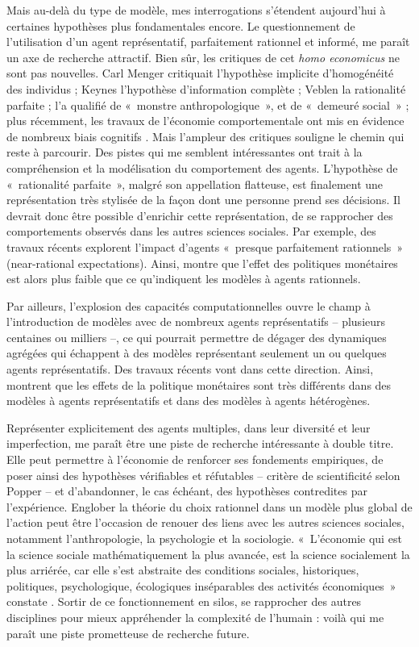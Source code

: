 Mais au-delà du type de modèle, mes interrogations s'étendent aujourd'hui à certaines hypothèses plus fondamentales encore. 
Le questionnement de l’utilisation d’un agent représentatif, parfaitement rationnel et informé, me paraît un axe de recherche attractif. Bien sûr, les critiques de cet \textit{homo economicus} ne sont pas nouvelles. Carl Menger critiquait l’hypothèse implicite d’homogénéité des individus ; Keynes l’hypothèse d’information complète ; Veblen la rationalité parfaite ; \citet{Bourdieu1977} l’a qualifié de «~monstre anthropologique~», et \citet{Sen2012} de «~demeuré social~» ; plus récemment, les travaux de l’économie comportementale ont mis en évidence de nombreux biais cognitifs \citep{Thaler2009,Kahneman2011}.
Mais l’ampleur des critiques souligne le chemin qui reste à parcourir. Des pistes qui me semblent intéressantes ont trait à la compréhension et la modélisation du comportement des agents. L'hypothèse de «~rationalité parfaite~», malgré son appellation flatteuse, est finalement une représentation très stylisée de la façon dont une personne prend ses décisions. Il devrait donc être possible d'enrichir cette représentation, de se rapprocher des comportements observés dans les autres sciences sociales. Par exemple, des travaux récents explorent l’impact d’agents «~presque parfaitement rationnels~» (near-rational expectations). Ainsi, \citet{Farhi2016} montre que l’effet des politiques monétaires est alors plus faible que ce qu’indiquent les modèles à agents rationnels.

Par ailleurs, l’explosion des capacités computationnelles ouvre le champ à l’introduction de modèles avec de nombreux agents représentatifs – plusieurs centaines ou milliers –, ce qui pourrait permettre de dégager des dynamiques agrégées qui échappent à des modèles représentant seulement un ou quelques agents représentatifs. Des travaux récents vont dans cette direction. Ainsi, \citet{Kaplan2016} montrent que les effets de la politique monétaires sont très différents dans des modèles à agents représentatifs et dans des modèles à agents hétérogènes.

Représenter explicitement des agents multiples, dans leur diversité et leur imperfection, me paraît être une piste de recherche intéressante à double titre. Elle peut permettre à l’économie de renforcer ses fondements empiriques, de poser ainsi des hypothèses vérifiables et réfutables – critère de scientificité selon Popper – et d’abandonner, le cas échéant, des hypothèses contredites par l’expérience. Englober la théorie du choix rationnel dans un modèle plus global de l’action peut être l’occasion de renouer des liens avec les autres sciences sociales, notamment l’anthropologie, la psychologie et la sociologie. «~L'économie qui est la science sociale mathématiquement la plus avancée, est la science socialement la plus arriérée, car elle s'est abstraite des conditions sociales, historiques, politiques, psychologique, écologiques inséparables des activités économiques~» constate \citet{Morin1999}. Sortir de ce fonctionnement en silos, se rapprocher des autres disciplines pour mieux appréhender la complexité de l'humain : voilà qui me paraît une piste prometteuse de recherche future.





